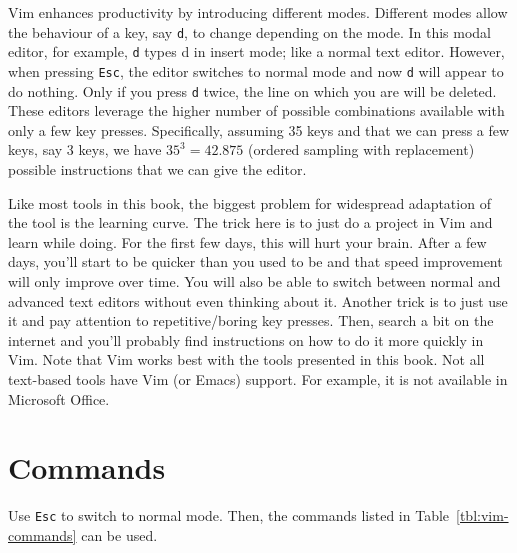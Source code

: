 \documentclass[
  14pt
  american,
  paper=a4,
  ,captions=tableheading
]{scrbook}
\newcommand{\passthrough}[1]{#1}
\begin{document}
Vim enhances productivity by introducing different modes. Different
modes allow the behaviour of a key, say \passthrough{\lstinline!d!}, to
change depending on the mode. In this modal editor, for example,
\passthrough{\lstinline!d!} types d in insert mode; like a normal text
editor. However, when pressing \passthrough{\lstinline!Esc!}, the editor
switches to normal mode and now \passthrough{\lstinline!d!} will appear
to do nothing. Only if you press \passthrough{\lstinline!d!} twice, the
line on which you are will be deleted. These editors leverage the higher
number of possible combinations available with only a few key presses.
Specifically, assuming 35 keys and that we can press a few keys, say 3
keys, we have \(35^3 = 42.875\) (ordered sampling with replacement)
possible instructions that we can give the editor.

Like most tools in this book, the biggest problem for widespread
adaptation of the tool is the learning curve. The trick here is to just
do a project in Vim and learn while doing. For the first few days, this
will hurt your brain. After a few days, you'll start to be quicker than
you used to be and that speed improvement will only improve over time.
You will also be able to switch between normal and advanced text editors
without even thinking about it. Another trick is to just use it and pay
attention to repetitive/boring key presses. Then, search a bit on the
internet and you'll probably find instructions on how to do it more
quickly in Vim. Note that Vim works best with the tools presented in
this book. Not all text-based tools have Vim (or Emacs) support. For
example, it is not available in Microsoft Office.

\hypertarget{commands-1}{%
\section{Commands}\label{commands-1}}

Use \passthrough{\lstinline!Esc!} to switch to normal mode. Then, the
commands listed in Table~\ref{tbl:vim-commands} can be used.
\end{document}
